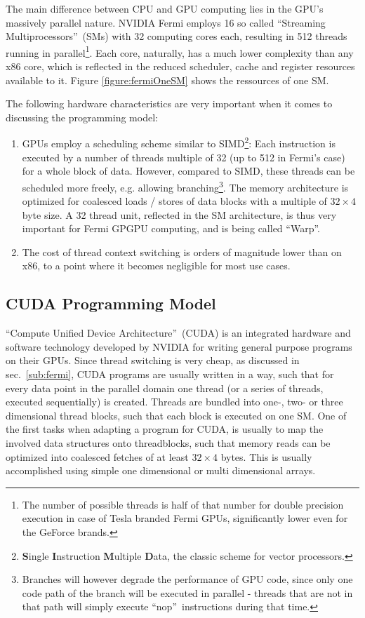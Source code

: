 The main difference between CPU and GPU computing lies in the GPU's massively parallel nature. NVIDIA Fermi employs 16 so called \textquotedblleft Streaming Multiprocessors\textquotedblright\ (SMs) with 32 computing cores each, resulting in 512 threads running in parallel\footnote{The number of possible threads is half of that number for double precision execution in case of Tesla branded Fermi GPUs, significantly lower even for the GeForce brands.}. Each core, naturally, has a much lower complexity than any x86 core, which is reflected in the reduced scheduler, cache and register resources available to it. Figure \ref{figure:fermiOneSM} shows the ressources of one SM.  

The following hardware characteristics are very important when it comes to discussing the programming model: 
\begin{enumerate}
 \item GPUs employ a scheduling scheme similar to SIMD\footnote{\textbf{S}ingle \textbf{I}nstruction \textbf{M}ultiple \textbf{D}ata, the classic scheme for vector processors.}: Each instruction is executed by a number of threads multiple of 32 (up to 512 in Fermi's case) for a whole block of data. However, compared to SIMD, these threads can be scheduled more freely, e.g. allowing branching\footnote{Branches will however degrade the performance of GPU code, since only one code path of the branch will be executed in parallel - threads that are not in that path will simply execute \textquotedblleft nop\textquotedblright\ instructions during that time.}. The memory architecture is optimized for coalesced loads / stores of data blocks with a multiple of $32\times4$ byte size. A 32 thread unit, reflected in the SM architecture, is thus very important for Fermi GPGPU computing, and is being called \textquotedblleft Warp\textquotedblright.
 \item The cost of thread context switching is orders of magnitude lower than on x86, to a point where it becomes negligible for most use cases. 
\end{enumerate}

\subsection{CUDA Programming Model} \label{sub:cudaIntro}

\textquotedblleft Compute Unified Device Architecture\textquotedblright\ (CUDA) is an integrated hardware and software technology developed by NVIDIA for writing general purpose programs on their GPUs. Since thread switching is very cheap, as discussed in sec.~\ref{sub:fermi}, CUDA programs are usually written in a way, such that for every data point in the parallel domain one thread (or a series of threads, executed sequentially) is created. Threads are bundled into one-, two- or three dimensional thread blocks, such that each block is executed on one SM. One of the first tasks when adapting a program for CUDA, is usually to map the involved data structures onto threadblocks, such that memory reads can be optimized into coalesced fetches of at least $32\times4$ bytes. This is usually accomplished using simple one dimensional or multi dimensional arrays.

